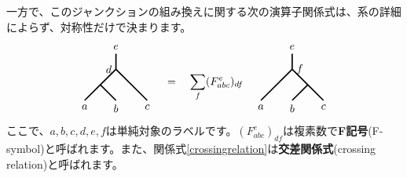 \documentclass[report,paper=a4, fontsize=12pt, line_length=16cm, number_of_lines=33,dvipdfmx]{jlreq}
\newcommand{\kyou}[1]{{\sffamily \bfseries #1}}
\numberwithin{equation}{chapter}
\begin{document}
一方で、このジャンクションの組み換えに関する次の演算子関係式は、系の詳細によらず、対称性だけで決まります。
\begin{align}
  \begin{tikzpicture}[baseline=0]
      \draw[very thick](0,0)--(0.5,0.5) node [left]{$d$};
      \draw[very thick](0,0)--(-0.5,-0.5) node[below]{$a$};
      \draw[very thick](0,0)--(0.5,-0.5) node[below]{$b$};
      \draw[very thick](0.5,0.5)--(1.5,-0.5) node[below]{$c$};
      \draw[very thick](0.5,0.5)--(0.5,1) node[above]{$e$};
  \end{tikzpicture}
  \quad = \quad
  \sum_{f}
  (F_{abc}^e)_{df}
  \quad
  \begin{tikzpicture}[baseline=0]
      \draw[very thick](1,0)--(0.5,0.5) node [right]{$f$};
      \draw[very thick](0.5,0.5)--(-0.5,-0.5) node[below]{$a$};
      \draw[very thick](1,0)--(0.5,-0.5) node[below]{$b$};
      \draw[very thick](1,0)--(1.5,-0.5) node[below]{$c$};
      \draw[very thick](0.5,0.5)--(0.5,1) node[above]{$e$};
  \end{tikzpicture}
  \label{crossingrelation}
\end{align}
ここで、$a,b,c,d,e,f$は単純対象のラベルです。$(F_{abc}^e)_{df}$は複素数で\kyou{F記号}(F-symbol)と呼ばれます。また、関係式\eqref{crossingrelation}は\kyou{交差関係式}(crossing relation)と呼ばれます。
\end{document}
